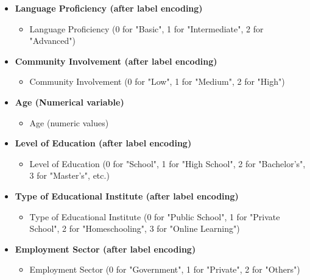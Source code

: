\documentclass[a4paper,twoside]{article}
\begin{document}
\begin{itemize}
    \item \textbf{Language Proficiency (after label encoding)}
    \begin{itemize}
        \item Language Proficiency (0 for "Basic", 1 for "Intermediate", 2 for "Advanced")
    \end{itemize}
    
    \item \textbf{Community Involvement (after label encoding)}
    \begin{itemize}
        \item Community Involvement (0 for "Low", 1 for "Medium", 2 for "High")
    \end{itemize}
    
    \item \textbf{Age (Numerical variable)}
    \begin{itemize}
        \item Age (numeric values)
    \end{itemize}
    
    \item \textbf{Level of Education (after label encoding)}
    \begin{itemize}
        \item Level of Education (0 for "School", 1 for "High School", 2 for "Bachelor’s", 3 for "Master’s", etc.)
    \end{itemize}
    
    \item \textbf{Type of Educational Institute (after label encoding)}
    \begin{itemize}
        \item Type of Educational Institute (0 for "Public School", 1 for "Private School", 2 for "Homeschooling", 3 for "Online Learning")
    \end{itemize}
    
    \item \textbf{Employment Sector (after label encoding)}
    \begin{itemize}
        \item Employment Sector (0 for "Government", 1 for "Private", 2 for "Others")
    \end{itemize}
\end{itemize}
\end{document}
